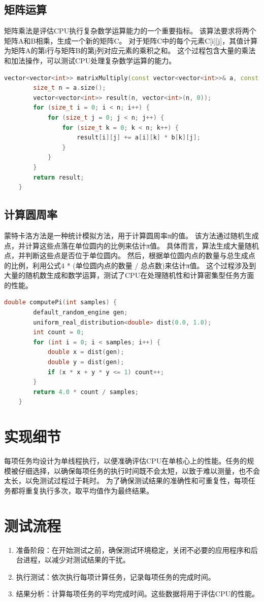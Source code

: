 \documentclass{ctexart}
\begin{document}
\subsection{矩阵运算}
矩阵乘法是评估CPU执行复杂数学运算能力的一个重要指标。
该算法要求将两个矩阵A和B相乘，生成一个新的矩阵C。
对于矩阵C中的每个元素C[i][j]，其值计算为矩阵A的第i行与矩阵B的第j列对应元素的乘积之和。
这个过程包含大量的乘法和加法操作，可以测试CPU处理复杂数学运算的能力。
\begin{lstlisting}[language=C++]
    vector<vector<int>> matrixMultiply(const vector<vector<int>>& a, const vector<vector<int>>& b) {
        size_t n = a.size();
        vector<vector<int>> result(n, vector<int>(n, 0));
        for (size_t i = 0; i < n; i++) {
            for (size_t j = 0; j < n; j++) {
                for (size_t k = 0; k < n; k++) {
                    result[i][j] += a[i][k] * b[k][j];
                }
            }
        }
        return result;
    }
\end{lstlisting}
\subsection{计算圆周率}
蒙特卡洛方法是一种统计模拟方法，用于计算圆周率π的值。
该方法通过随机生成点，并计算这些点落在单位圆内的比例来估计π值。
具体而言，算法生成大量随机点，并判断这些点是否位于单位圆内。
然后，根据单位圆内点的数量与总生成点的比例，利用公式4 * (单位圆内点的数量 / 总点数)来估计π值。
这个过程涉及到大量的随机数生成和数学运算，测试了CPU在处理随机性和计算密集型任务方面的性能。
\begin{lstlisting}[language=C++]
    double computePi(int samples) {
        default_random_engine gen;
        uniform_real_distribution<double> dist(0.0, 1.0);
        int count = 0;
        for (int i = 0; i < samples; i++) {
            double x = dist(gen);
            double y = dist(gen);
            if (x * x + y * y <= 1) count++;
        }
        return 4.0 * count / samples;
    }
\end{lstlisting}
\section{实现细节}
每项任务均设计为单线程执行，以便准确评估CPU在单核心上的性能。任务的规模被仔细选择，以确保每项任务的执行时间既不会太短，以致于难以测量，也不会太长，以免测试过程过于耗时。
为了确保测试结果的准确性和可重复性，每项任务都将重复执行多次，取平均值作为最终结果。
\section{测试流程}
\begin{enumerate}
    \item 准备阶段：在开始测试之前，确保测试环境稳定，关闭不必要的应用程序和后台进程，以减少对测试结果的干扰。
    \item 执行测试：依次执行每项计算任务，记录每项任务的完成时间。
    \item 结果分析：计算每项任务的平均完成时间。这些数据将用于评估CPU的性能。
\end{enumerate}
\end{document}
